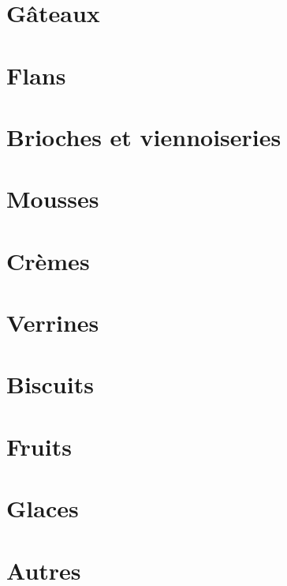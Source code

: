 \documentclass[A4paper,twoside, 12pt]{book}
\begin{document}
	\chapter{G\^ateaux}







		
	\chapter{Flans}


	\chapter{Brioches et viennoiseries}




	\chapter{Mousses}
	\chapter{Cr\`emes}


	\chapter{Verrines}
	
	\chapter{Biscuits}


	\chapter{Fruits}

	\chapter{Glaces}
	\chapter{Autres}





\end{document}
